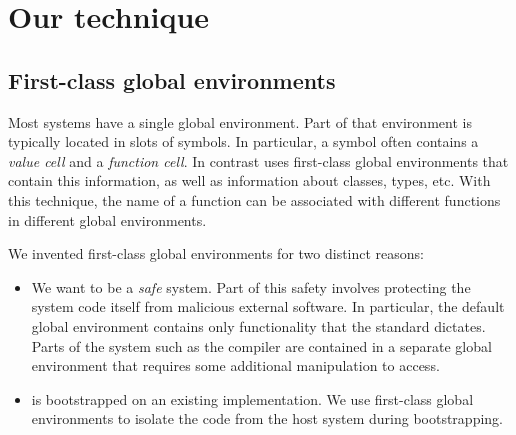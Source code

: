 \section{Our technique}
\label{sec-our-technique}

\subsection{First-class global environments}

Most \commonlisp{} systems have a single global environment.  Part of
that environment is typically located in slots of symbols.  In
particular, a symbol often contains a \emph{value cell} and a
\emph{function cell}.  In contrast \sicl{} uses first-class global
environments \cite{Strandh:2015:ELS:Environments} that contain this
information, as well as information about classes, types, etc.
With this technique, the name of a function can be associated with
different functions in different global environments.

We invented first-class global environments for two distinct reasons:

\begin{itemize}
\item We want \sicl{} to be a \emph{safe} system.  Part of this safety
  involves protecting the system code itself from malicious external
  software.  In particular, the default global environment contains
  only functionality that the \commonlisp{} standard dictates.  Parts
  of the system such as the compiler are contained in a separate
  global environment that requires some additional manipulation to
  access.
\item \sicl{} is bootstrapped
  \cite{Durand-Strandh:2019:ELS:Bootstrapping} on an existing
  \commonlisp{} implementation.  We use first-class global
  environments to isolate the \sicl{} code from the host system during
  bootstrapping.
\end{itemize}


